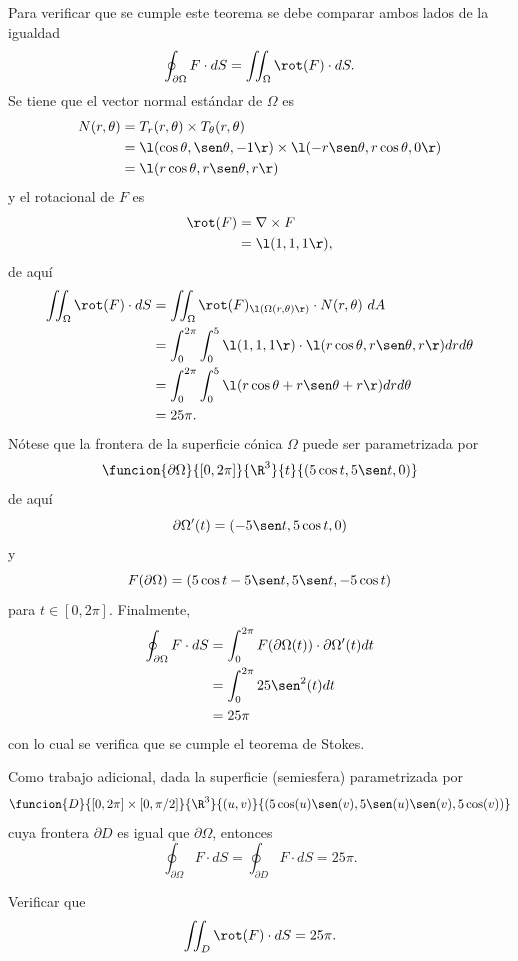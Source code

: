 \documentclass[a4,11pt]{aleph-examen}
\begin{document}
\begin{preguntas}
\begin{respuesta}
\begin{respuesta}
\begin{respuesta}
\begin{enumerate}
\begin{respuesta}
Para verificar que se cumple este teorema se debe comparar ambos lados de la igualdad
\[
    \oint_{\partial \Omega} F \cdot dS=\iint_{\Omega} \rot (F) \cdot dS.
\]
Se tiene que el vector normal estándar de $\Omega$ es
	\[
	    \begin{aligned}
		N(r,\theta)&=T_r(r,\theta) \times T_{\theta}(r,\theta)\\
		&=\l(\cos \theta, \sen \theta, -1 \r)\times \l(-r \sen \theta, r \cos \theta, 0\r)\\
		&= \l(r \cos \theta, r \sen \theta, r\r)
		\end{aligned}
	\]
y el rotacional de $F$ es
	\[
	    \begin{aligned}
		\rot(F)&=\nabla \times F\\
		&=\l(1,1,1\r),
		\end{aligned}
	\]
de aquí
	\begin{align*}
		\iint_{\Omega} \rot (F) \cdot dS&=\iint_{\Omega} \rot(F)_{\l(\Omega(r,\theta)\r)} \cdot N(r,\theta)\ dA\\
			&=\int_0^{2\pi} \int_0^5 \l(1,1,1\r) \cdot \l(r \cos \theta, r \sen \theta, r\r) dr d\theta\\
			&=\int_0^{2\pi} \int_0^5 \l(r \cos \theta + r \sen \theta + r\r) dr d\theta\\
			&=25\pi.
	\end{align*}
Nótese que la frontera de la superficie cónica $\Omega$ puede ser parametrizada por
    \[
        \funcion{\partial \Omega}{[0,2\pi]}{\R^3}{t}{(5\cos t,5\sen t,0)}
    \]
de aquí
\[
    \partial \Omega'(t)=(-5\sen t,5\cos t,0)
\]
y
\[
    F(\partial \Omega)=(5\cos t-5\sen t,5\sen t,-5\cos t)
\]
para $t\in [0,2\pi]$.
Finalmente,
\begin{align*}
    \oint_{\partial \Omega} F \cdot dS&=\int_0^{2\pi} F(\partial \Omega(t)) \cdot \partial \Omega'(t) dt\\
    &=\int_0^{2\pi} 25\sen^2(t)dt\\
    &=25\pi
\end{align*}
con lo cual se verifica que se cumple el teorema de Stokes.

Como trabajo adicional, dada la superficie (semiesfera) parametrizada por
\[
    \funcion{D}{[0,2\pi]\times[0,\pi/2]}{\R^3}{(u,v)}{(5\cos(u)\sen(v),5\sen(u)\sen(v),5\cos(v))}
\]
cuya frontera $\partial D$ es igual que $\partial \Omega$, entonces
\[
    \oint_{\partial \Omega} F \cdot dS=\oint_{\partial D} F \cdot dS=25\pi.
\]

Verificar que
\[
    \iint_{D} \rot (F) \cdot dS=25\pi.
\]
\end{respuesta}


\end{enumerate}
\end{respuesta}
\end{respuesta}
\end{respuesta}
\end{preguntas}
\end{document}
